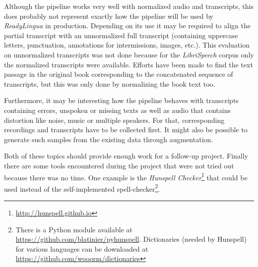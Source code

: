 Although the pipeline works very well with normalized audio and transcripts, this does probably not represent exactly how the pipeline will be used by \textit{ReadyLingua} in production. Depending on its use it may be required to align the partial transcript with an unnormalized full transcript (containing uppercase letters, punctuation, annotations for intermissions, images, etc.). This evaluation on unnormalized transcripts was not done because for the \textit{LibriSpeech} corpus only the normalized transcripts were available. Efforts have been made to find the text passage in the original book corresponding to the concatenated sequence of transcripts, but this was only done by normalizing the book text too.

Furthermore, it may be interesting how the pipeline behaves with transcripts containing errors, unspoken or missing texts as well as audio that contains distortion like noise, music or multiple speakers. For that, corresponding recordings and transcripts have to be collected first. It might also be possible to generate such samples from the existing data through augmentation.

Both of these topics should provide enough work for a follow-up project. Finally there are some tools encountered during the project that were not tried out because there was no time. One example is the \textit{Hunspell Checker}\footnote{\url{http://hunspell.github.io}} that could be used instead of the self-implemented spell-checker\footnote{There is a Python module available at \url{https://github.com/blatinier/pyhunspell}. Dictionaries (needed by Hunspell) for various languages can be downloaded at \url{https://github.com/wooorm/dictionaries}}.